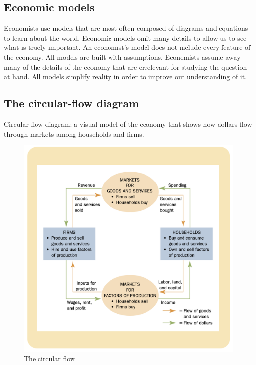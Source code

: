 \subsection{Economic models}

Economists use models that are most often composed of diagrams and equations to learn about the world.
Economic models omit many details to allow us to see what is truely important.
An economist's model does not include every feature of the economy.
All models are built with assumptions.
Economists assume away many of the details of the economy that are errelevant for studying the question at hand.
All models simplify reality in order to improve our understanding of it.

\subsection{The circular-flow diagram}

Circular-flow diagram: a visual model of the economy that shows how dollars flow through markets among households and firms.


\begin{figure}[!ht]
  \centering
  \includegraphics[width=\textwidth]{pics/circular-flow.png}
  \caption{The circular flow}
  \label{fig:circular-flow}
\end{figure}